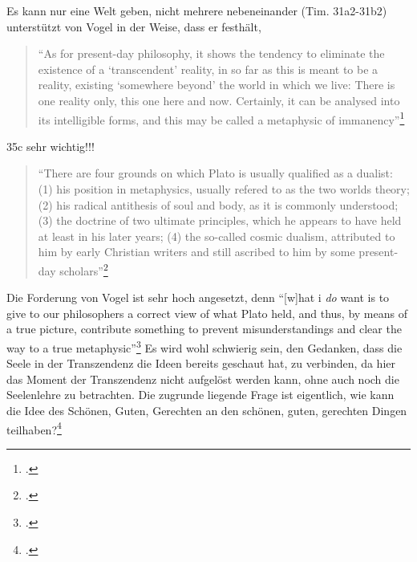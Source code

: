 \documentclass[12pt]{article}
\newcommand*{\zitatblock}[1]{%
    \begin{quote}
    \fontsize{10}{12}\selectfont
    \setlength{\parskip}{1.0em}
    #1
    \end{quote}
}
\begin{document}
Es kann nur eine Welt geben, nicht mehrere nebeneinander (Tim. 31a2-31b2)
unterstützt von Vogel in der Weise, dass er festhält, \zitatblock{\enquote{As for present-day philosophy, it shows the tendency to eliminate the existence of a \enquote{transcendent} reality, in so far as this is meant to be a reality, existing \enquote{somewhere beyond} the world in which we live: There is one reality only, this one here and now. Certainly, it can be analysed into its intelligible forms, and this may be called a metaphysic of immanency}\footcite[][S. 161]{Vogel}}
35c sehr wichtig!!!
\zitatblock{\enquote{There are four grounds on which Plato is usually qualified as a dualist: (1) his position in metaphysics, usually refered to as the two worlds theory; (2) his radical antithesis of soul and body, as it is commonly understood; (3) the doctrine of two ultimate principles, which he appears to have held at least in his later years; (4) the so-called cosmic dualism, attributed to him by early Christian writers and still ascribed to him by some present-day scholars}\footcite[][S. 159]{Vogel}}
Die Forderung von Vogel ist sehr hoch angesetzt, denn \enquote{[w]hat i \emph{do} want is to give to our philosophers a correct view of what Plato held, and thus, by means of a true picture, contribute something to prevent misunderstandings and clear the way to a true metaphysic}\footcite[vgl.][S. 161]{Vogel}
Es wird wohl schwierig sein, den Gedanken, dass die Seele in der Transzendenz die Ideen bereits geschaut hat, zu verbinden, da hier das Moment der Transzendenz nicht aufgelöst werden kann, ohne auch noch die Seelenlehre zu betrachten.
Die zugrunde liegende Frage ist eigentlich, wie kann die Idee des Schönen, Guten, Gerechten an den schönen, guten, gerechten Dingen teilhaben?\footcite[vgl.][S. 16]{Martin73}
\end{document}

